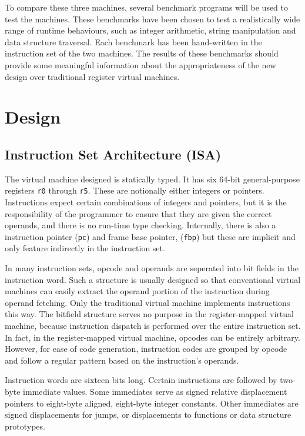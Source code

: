 \documentclass[A4]{sig-alternate}
\begin{document}
To compare these three machines, several benchmark programs will be used to test the machines. These benchmarks have been chosen to test a realistically wide range of runtime behaviours, such as integer arithmetic, string manipulation and data structure traversal. Each benchmark has been hand-written in the instruction set of the two machines. The results of these benchmarks should provide some meaningful information about the appropriateness of the new design over traditional register virtual machines.


\section{Design}

\subsection{Instruction Set Architecture (ISA)}
The virtual machine designed is statically typed. It has six 64-bit general-purpose registers \texttt{r0} through \texttt{r5}. These are notionally either integers or pointers. Instructions expect certain combinations of integers and pointers, but it is the responsibility of the programmer to ensure that they are given the correct operands, and there is no run-time type checking. Internally, there is also a instruction pointer (\texttt{pc}) and frame base pointer, (\texttt{fbp}) but these are implicit and only feature indirectly in the instruction set.

In many instruction sets, opcode and operands are seperated into bit fields in the instruction word. Such a structure is usually designed so that conventional virtual machines can easily extract the operand portion of the instruction during operand fetching. Only the traditional virtual machine implements instructions this way. The bitfield structure serves no purpose in the register-mapped virtual machine, because instruction dispatch is performed over the entire instruction set. In fact, in the register-mapped virtual machine, opcodes can be entirely arbitrary. However, for ease of code generation, instruction codes are grouped by opcode and follow a regular pattern based on the instruction's operands.

Instruction words are sixteen bits long. Certain instructions are followed by two-byte immediate values. Some immediates serve as signed relative displacement pointers to eight-byte aligned, eight-byte integer constants. Other immediates are signed displacements for jumps, or displacements to functions or data structure prototypes.
\end{document}
